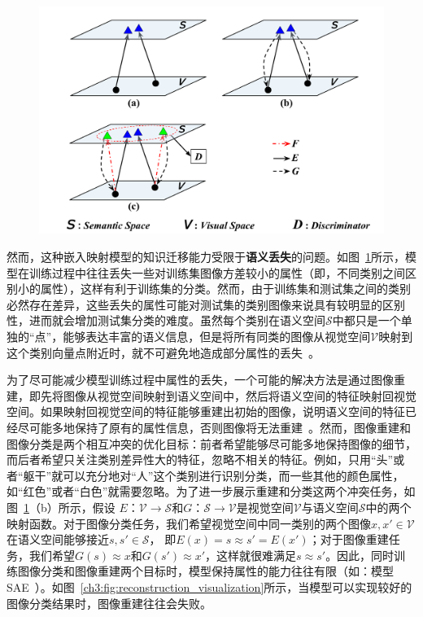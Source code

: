 \begin{figure}
    \centering
        \includegraphics[width=0.98\linewidth]{chapter3/res/zsl_paradigms.pdf}
    \label{ch3:fig:zsl_paradigms}
\end{figure}

然而，这种嵌入映射模型的知识迁移能力受限于\textbf{语义丢失}的问题。如图~\ref{ch3:fig:zsl_paradigms}所示，模型在训练过程中往往丢失一些对训练集图像方差较小的属性（即，不同类别之间区别小的属性），这样有利于训练集的分类。然而，由于训练集和测试集之间的类别必然存在差异，这些丢失的属性可能对测试集的类别图像来说具有较明显的区别性，进而就会增加测试集分类的难度。虽然每个类别在语义空间$\mathcal{S}$中都只是一个单独的“点”，能够表达丰富的语义信息，但是将所有同类的图像从视觉空间$\mathcal{V}$映射到这个类别向量点附近时，就不可避免地造成部分属性的丢失~\cite{lazaridou2015hubness,fu2015transductive}。


为了尽可能减少模型训练过程中属性的丢失，一个可能的解决方法是通过图像重建，即先将图像从视觉空间映射到语义空间中，然后将语义空间的特征映射回视觉空间。如果映射回视觉空间的特征能够重建出初始的图像，说明语义空间的特征已经尽可能多地保持了原有的属性信息，否则图像将无法重建~\cite{kim2017learning,yi2017dualgan,zhu2017unpaired,he2016dual}。然而，图像重建和图像分类是两个相互冲突的优化目标：前者希望能够尽可能多地保持图像的细节，而后者希望只关注类别差异性大的特征，忽略不相关的特征。例如，只用“头”或者“躯干”就可以充分地对“人”这个类别进行识别分类，而一些其他的颜色属性，如“红色”或者“白色”就需要忽略。为了进一步展示重建和分类这两个冲突任务，如图~\ref{ch3:fig:zsl_paradigms}（b）所示，假设 $E$：$\mathcal{V}\rightarrow \mathcal{S}$和$G$：$\mathcal{S}\rightarrow \mathcal{V}$是视觉空间$\mathcal{V}$与语义空间$\mathcal{S}$中的两个映射函数。对于图像分类任务，我们希望视觉空间中同一类别的两个图像$x, x'\in \mathcal{V}$在语义空间能够接近$s, s'\in\mathcal{S}$， 即$E(x) = s \approx s' = E(x')$；对于图像重建任务，我们希望$G(s)\approx x$和$G(s')\approx x'$，这样就很难满足$s\approx s'$。因此，同时训练图像分类和图像重建两个目标时，模型保持属性的能力往往有限（如：模型SAE~\cite{kodirov2017semantic}）。如图~\ref{ch3:fig:reconstruction_visualization}所示，当模型可以实现较好的图像分类结果时，图像重建往往会失败。

